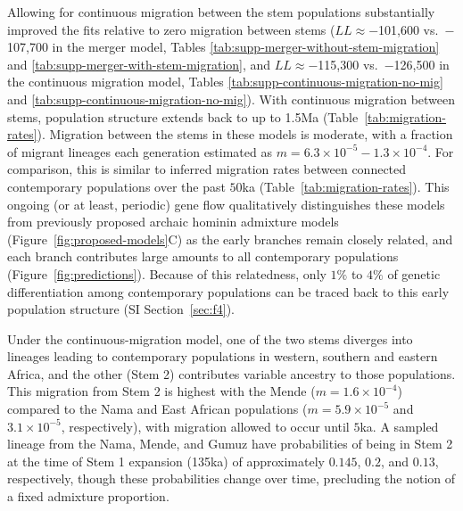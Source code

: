 \documentclass[]{article}
\begin{document}
Allowing for continuous migration between the stem populations substantially
improved the fits relative to zero migration between stems ($LL \approx
-$101,600 vs.\ $-$107,700 in the merger model, Tables
\ref{tab:supp-merger-without-stem-migration} and
\ref{tab:supp-merger-with-stem-migration}, and $LL \approx -$115,300 vs.\
$-$126,500 in the continuous migration model, Tables
\ref{tab:supp-continuous-migration-no-mig} and
\ref{tab:supp-continuous-migration-no-mig}).  With continuous migration between
stems, population structure extends back to up to 1.5Ma
(Table~\ref{tab:migration-rates}).  Migration between the stems in these models
is moderate, with a fraction of migrant lineages each generation estimated as
$m=6.3\times10^{-5}-1.3\times10^{-4}$. For comparison, this is similar to
inferred migration rates between connected contemporary populations over the
past $50$ka (Table~\ref{tab:migration-rates}). This ongoing (or at least,
periodic) gene flow qualitatively distinguishes these models from previously
proposed archaic hominin admixture models (Figure~\ref{fig:proposed-models}C)
as the early branches remain closely related, and each branch contributes large
amounts to all contemporary populations (Figure~\ref{fig:predictions}).
Because of this relatedness, only $1\%$ to $4\%$ of genetic differentiation
among contemporary populations can be traced back to this early population
structure (SI Section~\ref{sec:f4}).
 
Under the continuous-migration model, one of the two stems diverges into
lineages leading to contemporary populations in western, southern and eastern
Africa, and the other (Stem 2) contributes variable ancestry to those
populations. This migration from Stem 2 is highest with the Mende
($m=1.6\times10^{-4}$) compared to the Nama and East African populations
($m=5.9\times10^{-5}$ and $3.1\times10^{-5}$, respectively), with migration
allowed to occur until $5$ka. A sampled lineage from the Nama, Mende, and Gumuz
have probabilities of being in Stem 2 at the time of Stem 1 expansion (135ka)
of approximately $0.145$, $0.2$, and $0.13$, respectively, though these
probabilities change over time, precluding the notion of a fixed admixture
proportion.
\end{document}
